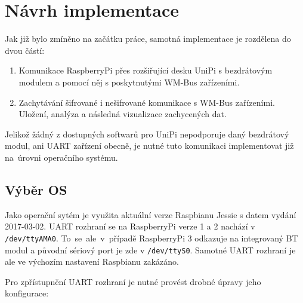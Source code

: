 \chapter{Návrh implementace}
\label{ChapterImplementace}

Jak již bylo zmíněno na začátku práce, samotná implementace je rozdělena do dvou částí:
\begin{enumerate}
	\item Komunikace RaspberryPi přes rozšiřující desku UniPi s bezdrátovým modulem a pomocí něj s poskytnutými WM-Bus zařízeními.
	\item Zachytávání šifrované i nešifrované komunikace s WM-Bus zařízeními. Uložení, analýza a následná vizualizace zachycených dat. 
\end{enumerate}

Jelikož žádný z dostupných softwarů pro UniPi nepodporuje daný bezdrátový modul, ani UART zařízení obecně, je nutné tuto komunikaci implementovat již na~úrovni operačního systému.


\section{Výběr OS}
Jako operační sytém je využita aktuální verze Raspbianu Jessie s datem vydání 2017-03-02. UART rozhraní se na RaspberryPi verze 1 a 2 nachází v \texttt{/dev/ttyAMA0}. To~se~ale~v~případě RaspberryPi 3 odkazuje na integrovaný BT modul a původní sériový port je zde v \texttt{/dev/ttyS0}. Samotné UART rozhraní je ale ve výchozím nastavení Raspbianu zakázáno.

Pro zpřístupnění UART rozhraní je nutné provést drobné úpravy jeho konfigurace:


